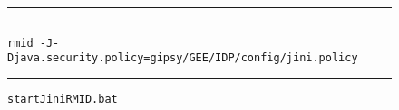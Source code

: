 \documentclass{easychair}
\begin{document}
\begin{enumerate}
\begin{enumerate}
\begin{figure*}[htpb!]\hrule
\begin{verbatim}

rmid -J-Djava.security.policy=gipsy/GEE/IDP/config/jini.policy
\end{verbatim}
\hrule
\caption{\texttt{startJiniRMID.bat}}\label{fig:startJiniRMID}\end{figure*}

	\end{enumerate}
\end{enumerate}


\printindex
\end{document}
